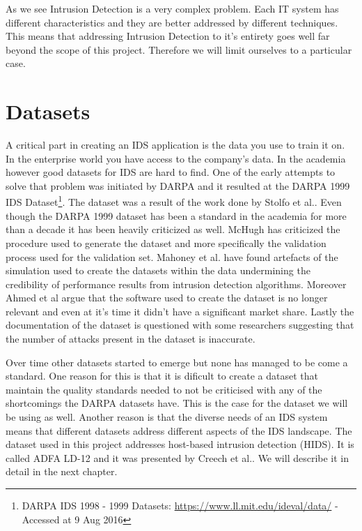 \documentclass[reqno,openany,12pt]{amsbook}
\begin{document}
As we see Intrusion Detection is a very complex problem.  Each IT system has different characteristics and they are better addressed by different techniques. This means that addressing Intrusion Detection to it's entirety goes well far beyond the scope of this project. Therefore we will limit ourselves to a particular case.




\section{Datasets}

A critical part in creating an IDS application is the data you use to train it on. In the enterprise world you have access to the company's data. In the academia however good datasets for IDS are hard to find. One of the early attempts to solve that problem was initiated by DARPA and it resulted at the DARPA 1999 IDS Dataset\footnote{DARPA IDS 1998 - 1999 Datasets: \url{https://www.ll.mit.edu/ideval/data/} - Accessed at 9 Aug 2016}. The dataset was a result of the work done by Stolfo et al.\cite{dat01}. Even though the DARPA 1999 dataset has been a standard in the academia for more than a decade it has been heavily criticized as well. McHugh\cite{dat02} has criticized the procedure used to generate the dataset and more specifically the validation process  used for the validation set. Mahoney et al.\cite{dat03} have found artefacts of the simulation used to create the datasets within the data undermining the credibility of performance results from intrusion detection algorithms. Moreover Ahmed et al\cite{dat04} argue that the software used to create the dataset is no longer relevant and even at it's time it didn't have a significant market share. Lastly the documentation of the dataset is questioned with some researchers suggesting
that the number of attacks present in the dataset is inaccurate.

Over time other datasets started to emerge but none has managed to be come a standard. One reason for this is that it is dificult to create a dataset that maintain the quality standards needed to not be criticised with any of the shortcomings the DARPA datasets have. This is the case for the dataset we will be using as well. Another reason is that the diverse needs of an IDS system means that different datasets address different aspects of the IDS landscape. The dataset used in this project addresses host-based intrusion detection (HIDS). It is called ADFA LD-12 and it was presented by Creech et al.\cite{dat2}. We will describe it in detail in the next chapter.
\end{document}
